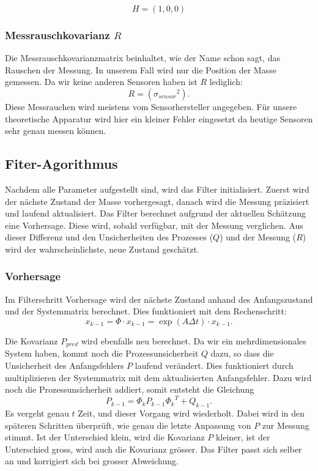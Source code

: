 \[ H = (1, 0, 0) \]

\subsubsection*{Messrauschkovarianz $R$}
Die Messrauschkovarianzmatrix beinhaltet, wie der Name schon sagt, das Rauschen der Messung. 
In unserem Fall wird nur die Position der Masse gemessen. Da wir keine anderen Sensoren haben ist $R$ lediglich:
\[ R= ({\sigma_{sensor}}^2).
 \] 
Diese Messrauchen wird meistens vom Sensorhersteller angegeben. 
Für unsere theoretische Apparatur wird hier ein kleiner Fehler eingesetzt da heutige Sensoren sehr genau messen können. 

\subsection{Fiter-Agorithmus}
Nachdem alle Parameter aufgestellt sind, wird das Filter initialisiert.
Zuerst wird der nächste Zustand der Masse vorhergesagt, danach wird die Messung präzisiert und laufend aktualisiert. 
Das Filter berechnet aufgrund der aktuellen Schätzung eine Vorhersage. 
Diese wird, sobald verfügbar, mit der Messung verglichen. 
Aus dieser Differenz und den Unsicherheiten des Prozesses ($Q$) und der Messung ($R$) wird der wahrscheinlichste, neue Zustand geschätzt.

\subsubsection*{Vorhersage}
Im Filterschritt Vorhersage wird der nächste Zustand anhand des Anfangszustand und der Systemmatrix berechnet. 
Dies funktioniert mit dem Rechenschritt:
\[ 
{x_{k-1}}=\Phi \cdot {x_{k-1}}= \exp(A\Delta t)\cdot{x_{k-1}}.
 \] 

Die Kovarianz $P_{pred}$ wird ebenfalls neu berechnet. Da wir ein mehrdimensionales System haben, kommt noch die Prozessunsicherheit $Q$ dazu, so dass die Unsicherheit des Anfangsfehlers $P$ laufend verändert. 
Dies funktioniert durch multiplizieren der Systemmatrix mit dem aktualisierten Anfangsfehler. 
Dazu wird noch die Prozessunsicherheit addiert, somit entsteht die Gleichung
\[ {P_{k-1}} = {\Phi_k}  {P_{k-1}} {\Phi_k} ^T + {Q_{k-1}} .\] 
Es vergeht genau $t$ Zeit, und dieser Vorgang wird wiederholt. 
Dabei wird in den späteren Schritten überprüft, wie genau die letzte Anpassung von $P$ zur Messung stimmt. 
Ist der Unterschied klein, wird die Kovarianz $P$ kleiner, ist der Unterschied gross, wird auch die Kovarianz grösser. 
Das Filter passt sich selber an und korrigiert sich bei grosser Abweichung.

